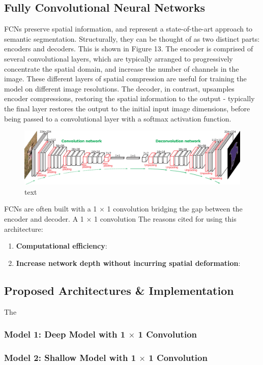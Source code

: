 \documentclass[a4paper]{article}
\begin{document}
\subsection{Fully Convolutional Neural Networks}
FCNs preserve spatial information, and represent a state-of-the-art approach to semantic segmentation. Structurally, they can be thought of as two distinct parts: encoders and decoders. This is shown in Figure 13. The encoder is comprised of several convolutional layers, which are typically arranged to progressively concentrate the spatial domain, and increase the number of channels in the image. These different layers of spatial compression are useful for training the model on different image resolutions. The decoder, in contrast, upsamples encoder compressions, restoring the spatial information to the output - typically the final layer restores the output to the initial input image dimensions, before being passed to a convolutional layer with a softmax activation function.
\begin{figure}[h]
\centering
\includegraphics[scale=0.25]{FCN}
\caption{text}
\end{figure}

FCNs are often built with a 1 $\times$ 1 convolution bridging the gap between the encoder and decoder. A 1 $\times$ 1 convolution The reasons cited for using this architecture:
\begin{enumerate}
\item \textbf{Computational efficiency}:
\item \textbf{Increase network depth without incurring spatial deformation}: 
\end{enumerate}



\subsection{Proposed Architectures \& Implementation}
The 
\subsubsection{Model 1: Deep Model with 1 $\times$ 1 Convolution}
\subsubsection{Model 2: Shallow Model with 1 $\times$ 1 Convolution}
\end{document}
